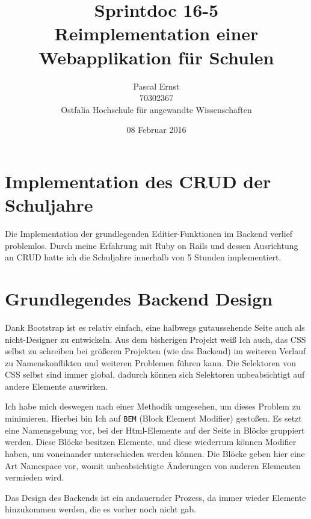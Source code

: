 \documentclass[a4paper,10pt]{scrartcl}
\begin{document}
\title{Sprintdoc 16-5 \\
  Reimplementation einer Webapplikation für Schulen}
\author{Pascal Ernst\\
  70302367 \\
  Ostfalia Hochschule für angewandte Wissenschaften}
\date{08 Februar 2016}
\maketitle

\newpage

\section{Implementation des CRUD der Schuljahre}

  Die Implementation der grundlegenden Editier-Funktionen im Backend verlief
  problemlos.
  Durch meine Erfahrung mit Ruby on Rails und dessen Ausrichtung an CRUD
  hatte ich die Schuljahre innerhalb von 5 Stunden implementiert.

\section{Grundlegendes Backend Design}

  Dank Bootstrap ist es relativ einfach, eine halbwegs gutaussehende Seite auch
  als nicht-Designer zu entwickeln.
  Aus dem bisherigen Projekt weiß Ich auch, das CSS selbst zu schreiben bei
  größeren Projekten (wie das Backend) im weiteren Verlauf zu Namenskonflikten
  und weiteren Problemen führen kann.
  Die Selektoren von CSS selbst sind immer global, dadurch können sich
  Selektoren unbeabsichtigt auf andere Elemente auswirken.

  Ich habe mich deswegen nach einer Methodik umgesehen, um dieses Problem zu
  minimieren.
  Hierbei bin Ich auf \lstinline{BEM} (Block Element Modifier) gestoßen.
  Es setzt eine Namensgebung vor, bei der Html-Elemente auf der Seite in
  Blöcke gruppiert werden.
  Diese Blöcke besitzen Elemente, und diese wiederrum können Modifier haben,
  um voneinander unterschieden werden können.
  Die Blöcke geben hier eine Art Namespace vor, womit unbeabsichtigte Änderungen
  von anderen Elementen vermieden wird.

  Das Design des Backends ist ein andauernder Prozess, da immer wieder Elemente
  hinzukommen werden, die es vorher noch nicht gab.
\end{document}
